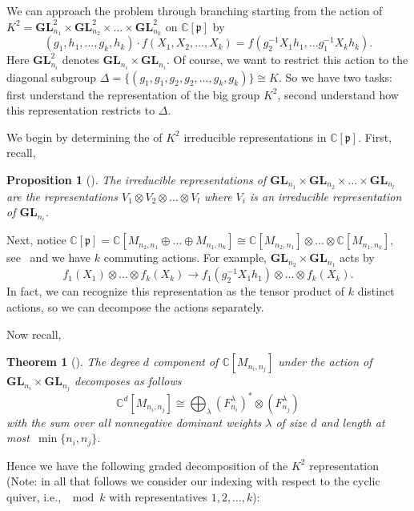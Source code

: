 \documentclass[11pt]{article}
\newtheorem{thm}[theo]{Theorem}
\newtheorem{prop}[theo]{Proposition}
\theoremstyle{definition}
\numberwithin{equation}{section}
\newcommand{\C}{\mathbb{C}}
\newcommand{\p}{\mathfrak{p}}
\newcommand{\GL}{\textbf{GL}}
\begin{document}
We can approach the problem through branching starting from the action of $K^2 = \GL_{n_1}^2 \times \GL_{n_2}^2 \times  \dots \times \GL_{n_k}^2$ on $\C[\p]$  by 
$$(g_1,h_1, \dots ,g_k, h_k) \cdot f(X_1,X_2, \dots , X_k) = f(g_2^{-1} X_1 h_1, \dots g_1^{-1} X_k h_k).$$
Here $\GL_{n_i}^2$ denotes $\GL_{n_i} \times \GL_{n_i}$. Of course, we want to restrict this action to the diagonal subgroup $\Delta = \{(g_1,g_1,g_2,g_2, \dots , g_k,g_k) \} \cong K$. So we have two tasks: first understand the representation of the big group $K^2$, second understand how this representation restricts to $\Delta$. 

We begin by determining the of $K^2$ irreducible representations in $\C[\p]$. First, recall,
    
    \begin{prop}[{\cite[Proposition 4.2.5]{GoodmanWallach2009}}] The irreducible representations of $\GL_{n_1} \times \GL_{n_2} \times \dots \times \GL_{n_l}$ are the representations $V_1 \otimes V_2 \otimes \dots \otimes V_l$ where $V_i$ is an irreducible representation of $\GL_{n_i}$.
    \end{prop}
        
Next, notice $\C[\p] = \C[M_{n_2,n_1} \oplus \dots \oplus M_{n_1,n_k}] \cong \C[M_{n_2,n_1} ]\otimes \dots \otimes \C[M_{n_1,n_k}]$, see~\cite[Lemma A.1.9]{GoodmanWallach2009} and we have $k$ commuting actions. For example, $\GL_{n_2} \times \GL_{n_1}$ acts by 
$$f_1(X_1) \otimes \dots \otimes f_k(X_k)\to f_1(g_2^{-1}X_1 h_1) \otimes \dots \otimes f_k(X_k).$$
In fact, we can recognize this representation as the tensor product of $k$ distinct actions, so we can decompose the actions separately. 

Now recall,

    \begin{thm}[{\label{thm-multfreedecomp}\cite[Theorem 5.6.7]{GoodmanWallach2009}}] The degree $d$ component of $\C[M_{n_i,n_j}]$ under the action of $\GL_{n_i} \times \GL_{n_j}$ decomposes as follows
$$\C^d[M_{n_i,n_j}] \cong \bigoplus_\lambda (F_{n_i}^\lambda)^*\otimes (F_{n_j}^\lambda)$$
with the sum over all nonnegative dominant weights $\lambda$ of size $d$ and length at most~$\min\{n_i,n_j\}$.
\end{thm}

Hence we have the following graded decomposition of the $K^2$ representation (Note: in all that follows we consider our indexing with respect to the cyclic quiver, i.e., $\mod k$ with representatives $1, 2, \ldots, k$):
\end{document}
